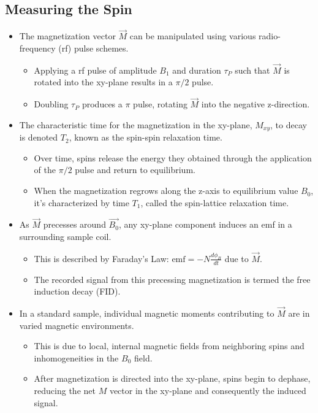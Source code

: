 \documentclass{article}
\begin{document}
\subsection{Measuring the Spin}\label{subsec:measuring-spin}
\begin{itemize}
    \item The magnetization vector \(\vec{M}\) can be manipulated using various radio-frequency (rf) pulse schemes.
    \begin{itemize}
        \item Applying a rf pulse of amplitude \(B_1\) and duration \(\tau_P\) such that \(\vec{M}\) is rotated into the xy-plane results in a \(\pi/2\) pulse.
        \item Doubling \(\tau_P\) produces a \(\pi\) pulse, rotating \(\vec{M}\) into the negative z-direction.
    \end{itemize}

    \item The characteristic time for the magnetization in the xy-plane, \(M_{xy}\), to decay is denoted \(T_2\), known as the spin-spin relaxation time.
    \begin{itemize}
        \item Over time, spins release the energy they obtained through the application of the \(\pi/2\) pulse and return to equilibrium.
        \item When the magnetization regrows along the z-axis to equilibrium value \(B_0\), it's characterized by time \(T_1\), called the spin-lattice relaxation time.
    \end{itemize}

    \item As \(\vec{M}\) precesses around \(\vec{B_0}\), any xy-plane component induces an emf in a surrounding sample coil.
    \begin{itemize}
        \item This is described by Faraday’s Law: \(\text{emf} = -N \frac{d\phi_B}{dt}\) due to \(\vec{M}\).
        \item The recorded signal from this precessing magnetization is termed the free induction decay (FID).
    \end{itemize}

    \item In a standard sample, individual magnetic moments contributing to \(\vec{M}\) are in varied magnetic environments.
    \begin{itemize}
        \item This is due to local, internal magnetic fields from neighboring spins and inhomogeneities in the \(B_0\) field.
        \item After magnetization is directed into the xy-plane, spins begin to dephase, reducing the net \(M\) vector in the xy-plane and consequently the induced signal.
    \end{itemize}


\end{itemize}
\end{document}
